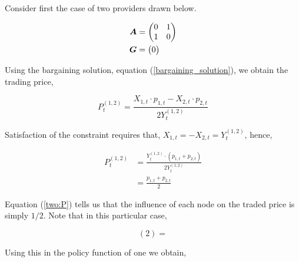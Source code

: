 Consider first the case of two providers drawn below.

\vspace{5mm}
\begin{minipage}{.5\textwidth}
    \resizebox{\textwidth}{!}{}
\end{minipage}
\begin{minipage}{.45\textwidth}
    \begin{equation*}
        \begin{split}
            \bm{A} &= \begin{pmatrix}
                0 & 1 \\
                1 & 0
            \end{pmatrix} \\
            \bm{G} &= \begin{pmatrix}
                0
            \end{pmatrix}
        \end{split}
    \end{equation*}
\end{minipage}
\vspace{5mm}

Using the bargaining solution, equation (\ref{bargaining_solution}), we obtain the trading price,

\begin{equation}
    P^{(1, 2)}_t = \frac{X_{1, t} \cdot p_{1, t} - X_{2, t} \cdot p_{2, t}}{2 Y^{(1, 2)}_t}
\end{equation}

Satisfaction of the constraint requires that, $X_{1, t} = - X_{2, t} = Y^{(1, 2)}_t$, hence,

\begin{equation} \label{two:P}
    \begin{split}
        P^{(1, 2)}_t &= \frac{Y^{(1, 2)}_t \cdot \left( p_{1, t} + p_{2, t} \right)}{2  Y^{(1, 2)}_t} \\
        &= \frac{p_{1, t} + p_{2, t}}{2}
    \end{split}
\end{equation}

Equation (\ref{two:P}) tells us that the influence of each node on the traded price is simply $1 / 2$. Note that in this particular case,

\begin{equation}
    (2 ) =
\end{equation}

Using this in the policy function of one we obtain,

